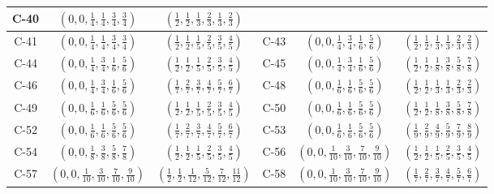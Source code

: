 \documentclass[11pt,a4paper]{amsart}
\theoremstyle{definition}
\theoremstyle{definition}
\numberwithin{equation}{section}
\begin{document}
{\begin{longtable}{|c|c|c|||c|c|c|}
C-40 & $\left(0,0,\frac{1}{4},\frac{1}{4},\frac{3}{4},\frac{3}{4}\right)$&$\left(\frac{1}{2},\frac{1}{2},\frac{1}{3},\frac{2}{3},\frac{1}{3},\frac{2}{3}\right)$\\
\hline
C-41 & $\left(0,0,\frac{1}{4},\frac{1}{4},\frac{3}{4},\frac{3}{4}\right)$& $\left(\frac{1}{2},\frac{1}{2},\frac{1}{5},\frac{2}{5},\frac{3}{5},\frac{4}{5}\right)$ & 
C-43 &$\left(0,0,\frac{1}{4},\frac{3}{4},\frac{1}{6},\frac{5}{6}\right)$ & $\left(\frac{1}{2},\frac{1}{2},\frac{1}{3},\frac{1}{3},\frac{2}{3},\frac{2}{3}\right)$ \\
\hline
C-44 & $(0,0,\frac{1}{4},\frac{3}{4},\frac{1}{6},\frac{5}{6})$&  $(\frac{1}{2},\frac{1}{2},\frac{1}{5},\frac{2}{5},\frac{3}{5},\frac{4}{5})$ & 
C-45 & $(0,0,\frac{1}{4},\frac{3}{4},\frac{1}{6},\frac{5}{6})$& $(\frac{1}{2},\frac{1}{2},\frac{1}{8},\frac{3}{8},\frac{5}{8},\frac{7}{8})$  \\
\hline
C-46 & $\left(0,0,\frac{1}{4},\frac{3}{4},\frac{1}{6},\frac{5}{6}\right)$ & $\left(\frac{1}{7},\frac{2}{7},\frac{3}{7},\frac{4}{7},\frac{5}{7},\frac{6}{7}\right)$ &  
C-48 & $\left(0,0,\frac{1}{6},\frac{1}{6},\frac{5}{6},\frac{5}{6}\right)$ & $\left(\frac{1}{2},\frac{1}{2},\frac{1}{3},\frac{1}{3},\frac{2}{3},\frac{2}{3}\right)$ \\
\hline
C-49 & $(0,0,\frac{1}{6},\frac{1}{6},\frac{5}{6},\frac{5}{6})$ &  $(\frac{1}{2},\frac{1}{2},\frac{1}{5},\frac{2}{5},\frac{3}{5},\frac{4}{5})$ & 
C-50 & $(0,0,\frac{1}{6},\frac{1}{6},\frac{5}{6},\frac{5}{6})$ & $(\frac{1}{2},\frac{1}{2},\frac{1}{8},\frac{3}{8},\frac{5}{8},\frac{7}{8})$  \\
\hline
C-52 & $(0,0,\frac{1}{6},\frac{1}{6},\frac{5}{6},\frac{5}{6})$&$(\frac{1}{7},\frac{2}{7},\frac{3}{7},\frac{4}{7},\frac{5}{7},\frac{6}{7})$  & 
C-53  & $\left(0,0,\frac{1}{6},\frac{1}{6},\frac{5}{6},\frac{5}{6}\right)$ & $\left(\frac{1}{9},\frac{2}{9},\frac{4}{9},\frac{5}{9},\frac{7}{9},\frac{8}{9}\right)$\\
\hline
C-54 & $(0,0,\frac{1}{8},\frac{3}{8},\frac{5}{8},\frac{7}{8})$&$(\frac{1}{2},\frac{1}{2},\frac{1}{5},\frac{2}{5},\frac{3}{5},\frac{4}{5})$ & 
C-56 & $(0,0,\frac{1}{10},\frac{3}{10},\frac{7}{10},\frac{9}{10})$  & $(\frac{1}{2},\frac{1}{2},\frac{1}{5},\frac{2}{5},\frac{3}{5},\frac{4}{5})$ \\
\hline
C-57 & $(0,0,\frac{1}{10},\frac{3}{10},\frac{7}{10},\frac{9}{10})$ & $(\frac{1}{2},\frac{1}{2},\frac{1}{12},\frac{5}{12},\frac{7}{12},\frac{11}{12})$ &
C-58 & $(0,0,\frac{1}{10},\frac{3}{10},\frac{7}{10},\frac{9}{10})$ & $(\frac{1}{7},\frac{2}{7},\frac{3}{7},\frac{4}{7},\frac{5}{7},\frac{6}{7})$ \\
\hline
\end{longtable}}
\end{document}
